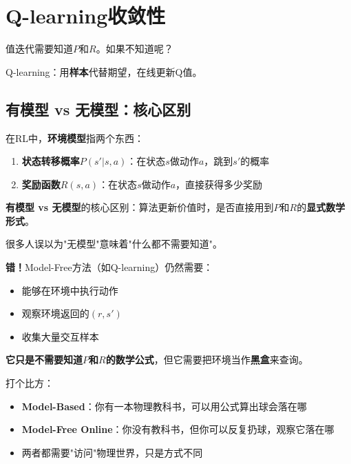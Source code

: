 \documentclass[11pt,a4paper]{article}
\theoremstyle{definition}
\begin{document}
\section{Q-learning收敛性}

\begin{plainwords}
值迭代需要知道$P$和$R$。如果不知道呢？

Q-learning：用\textbf{样本}代替期望，在线更新Q值。
\end{plainwords}

\subsection{有模型 vs 无模型：核心区别}

\begin{plainwords}[什么是"模型"？]
在RL中，\textbf{环境模型}指两个东西：
\begin{enumerate}
    \item \textbf{状态转移概率}$P(s'|s,a)$：在状态$s$做动作$a$，跳到$s'$的概率
    \item \textbf{奖励函数}$R(s,a)$：在状态$s$做动作$a$，直接获得多少奖励
\end{enumerate}

\textbf{有模型 vs 无模型}的核心区别：算法更新价值时，是否直接用到$P$和$R$的\textbf{显式数学形式}。
\end{plainwords}

\begin{keypoint}
很多人误以为"无模型"意味着"什么都不需要知道"。

\textbf{错！}Model-Free方法（如Q-learning）仍然需要：
\begin{itemize}
    \item 能够在环境中执行动作
    \item 观察环境返回的$(r, s')$
    \item 收集大量交互样本
\end{itemize}

\textbf{它只是不需要知道$P$和$R$的数学公式}，但它需要把环境当作\textbf{黑盒}来查询。

打个比方：
\begin{itemize}
    \item \textbf{Model-Based}：你有一本物理教科书，可以用公式算出球会落在哪
    \item \textbf{Model-Free Online}：你没有教科书，但你可以反复扔球，观察它落在哪
    \item 两者都需要"访问"物理世界，只是方式不同
\end{itemize}
\end{keypoint}
\end{document}
